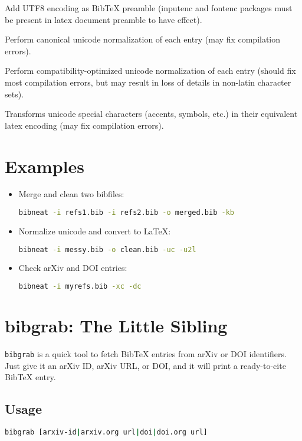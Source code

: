 \documentclass[11pt]{article}
\begin{document}
\begin{description}[leftmargin=2.5cm,style=nextline]
  \item[\texttt{-p, --add-encoding-preamble}] Add UTF8 encoding as BibTeX preamble (inputenc and fontenc packages must be present in latex document preamble to have effect).
  \item[\texttt{-uc, --unicode-canon-normalize}] Perform canonical unicode normalization of each entry (may fix compilation errors).
  \item[\texttt{-uk, --unicode-compat-normalize}] Perform compatibility-optimized unicode normalization of each entry (should fix most compilation errors, but may result in loss of details in non-latin character sets).
  \item[\texttt{-u2l, --unicode2latex}] Transforms unicode special characters (accents, symbols, etc.) in their equivalent latex encoding (may fix compilation errors).
\end{description}

\section{Examples}
\begin{itemize}
    \item Merge and clean two bibfiles:
    \begin{lstlisting}[language=bash]
bibneat -i refs1.bib -i refs2.bib -o merged.bib -kb
\end{lstlisting}
    \item Normalize unicode and convert to LaTeX:
    \begin{lstlisting}[language=bash]
bibneat -i messy.bib -o clean.bib -uc -u2l
\end{lstlisting}
    \item Check arXiv and DOI entries:
    \begin{lstlisting}[language=bash]
bibneat -i myrefs.bib -xc -dc
\end{lstlisting}
\end{itemize}

\section{bibgrab: The Little Sibling}
\texttt{bibgrab} is a quick tool to fetch BibTeX entries from arXiv or DOI identifiers. Just give it an arXiv ID, arXiv URL, or DOI, and it will print a ready-to-cite BibTeX entry.

\subsection{Usage}
\begin{tcolorbox}[colback=gray!5!white,colframe=gray!80!black,title=Basic Usage]
\begin{lstlisting}[language=bash]
bibgrab [arxiv-id|arxiv.org url|doi|doi.org url]
\end{lstlisting}
\end{tcolorbox}
\end{document}
